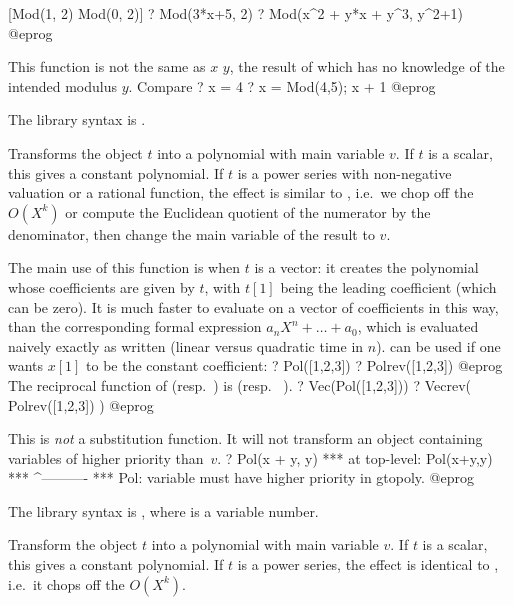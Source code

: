 [Mod(1, 2) Mod(0, 2)]
? Mod(3*x+5, 2)
? Mod(x^2 + y*x + y^3, y^2+1)
@eprog

This function is not the same as $x$ \kbd{\%} $y$, the result of which
has no knowledge of the intended modulus $y$. Compare
\bprog
? x = 4 %
? x = Mod(4,5); x + 1
@eprog

The library syntax is .

\label{se:Pol}
Transforms the object $t$ into a polynomial with main variable $v$. If $t$
is a scalar, this gives a constant polynomial. If $t$ is a power series with
non-negative valuation or a rational function, the effect is similar to
, i.e.~we chop off the $O(X^k)$ or compute the Euclidean
quotient of the numerator by the denominator, then change the main variable
of the result to $v$.

The main use of this function is when $t$ is a vector: it creates the
polynomial whose coefficients are given by $t$, with $t[1]$ being the leading
coefficient (which can be zero). It is much faster to evaluate
 on a vector of coefficients in this way, than the corresponding
formal expression $a_n X^n + \dots + a_0$, which is evaluated naively exactly
as written (linear versus quadratic time in $n$).  can be used if
one wants $x[1]$ to be the constant coefficient:
\bprog
? Pol([1,2,3])
? Polrev([1,2,3])
@eprog\noindent
The reciprocal function of  (resp.~) is  (resp.~
).
\bprog
? Vec(Pol([1,2,3]))
? Vecrev( Polrev([1,2,3]) )
@eprog\noindent

 This is \emph{not} a substitution function. It will not
transform an object containing variables of higher priority than~$v$.
\bprog
? Pol(x + y, y)
  ***   at top-level: Pol(x+y,y)
  ***                 ^----------
  *** Pol: variable must have higher priority in gtopoly.
@eprog

The library syntax is , where  is a variable number.

\label{se:Polrev}
Transform the object $t$ into a polynomial
with main variable $v$. If $t$ is a scalar, this gives a constant polynomial.
If $t$ is a power series, the effect is identical to , i.e.~it
chops off the $O(X^k)$.

